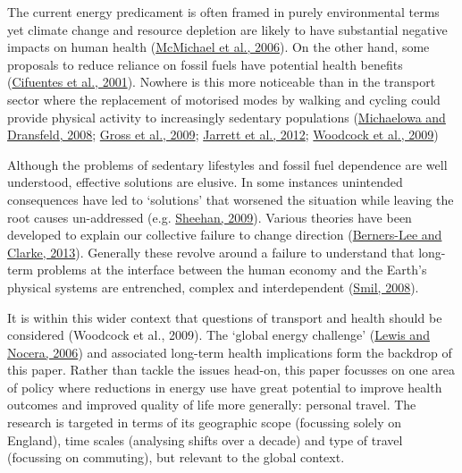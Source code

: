 The current energy predicament is often framed in purely environmental
terms yet climate change and resource depletion are likely to have
substantial negative impacts on human health
(\href{http://www.thelancet.com/journals/lancet/article/PIIS0140-6736\%2806\%2968079-3/abstract}{McMichael
et al., 2006}). On the other hand, some proposals to reduce reliance on
fossil fuels have potential health benefits
(\href{http://www.sciencemag.org/content/293/5533/1257.short}{Cifuentes
et al., 2001}). Nowhere is this more noticeable than in the transport
sector where the replacement of motorised modes by walking and cycling
could provide physical activity to increasingly sedentary populations
(\href{http://www.sciencedirect.com/science/article/B6VDY-4R00FMB-4/2/82bae464d0f4e053ced6751f608cbff9}{Michaelowa
and Dransfeld, 2008};
\href{http://www.ukerc.ac.uk/support/TransportReport}{Gross et al.,
2009}; \href{http://www.ncbi.nlm.nih.gov/pubmed/22682466}{Jarrett et
al., 2012}; \href{http://www.ncbi.nlm.nih.gov/pubmed/19942277}{Woodcock
et al., 2009})

Although the problems of sedentary lifestyles and fossil fuel dependence
are well understood, effective solutions are elusive. In some instances
unintended consequences have led to `solutions' that worsened the
situation while leaving the root causes un-addressed (e.g.
\href{http://dx.doi.org/10.1016/j.copbio.2009.05.010}{Sheehan, 2009}).
Various theories have been developed to explain our collective failure
to change direction (\href{http://www.burningquestion.info/}{Berners-Lee
and Clarke, 2013}). Generally these revolve around a failure to
understand that long-term problems at the interface between the human
economy and the Earth's physical systems are entrenched, complex and
interdependent
(\href{http://mitpress.mit.edu/books/energy-nature-and-society}{Smil,
2008}).

It is within this wider context that questions of transport and health
should be considered (Woodcock et al., 2009). The `global energy
challenge'
(\href{http://www.pnas.org/cgi/content/long/103/43/15729}{Lewis and
Nocera, 2006}) and associated long-term health implications form the
backdrop of this paper. Rather than tackle the issues head-on, this
paper focusses on one area of policy where reductions in energy use have
great potential to improve health outcomes and improved quality of life
more generally: personal travel. The research is targeted in terms of
its geographic scope (focussing solely on England), time scales
(analysing shifts over a decade) and type of travel (focussing on
commuting), but relevant to the global context.

